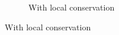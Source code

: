 \documentclass[mathserif]{beamer}
\begin{document}
\begin{frame}
{\begin{figure}
\begin{subfigure}[t]{0.49\textwidth}
\caption*{With local conservation}
\end{subfigure}
\end{figure}
}
\end{frame}

\end{document}
